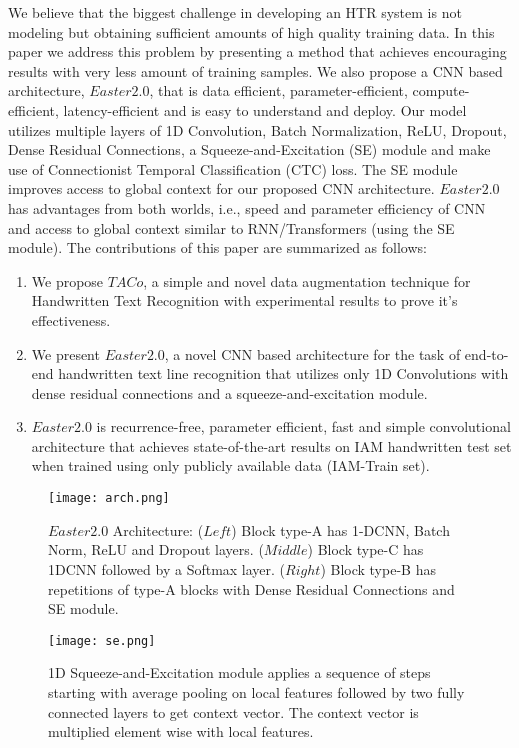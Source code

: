 \documentclass{article}
\begin{document}
We believe that the biggest challenge in developing an HTR system is not modeling but obtaining sufficient amounts of high quality training data. In this paper we address this problem by presenting a method that achieves encouraging results with very less amount of training samples. We also propose a CNN based architecture, $Easter2.0$,  that is data efficient, parameter-efficient, compute-efficient, latency-efficient and is easy to understand and deploy. Our model utilizes multiple layers of 1D Convolution, Batch Normalization, ReLU, Dropout, Dense Residual Connections, a Squeeze-and-Excitation (SE)\cite{hu2018squeeze} module and make use of  Connectionist Temporal Classification (CTC) loss\cite{graves2006connectionist}. The SE module improves access to global context for our proposed CNN architecture. $Easter2.0$ has advantages from both worlds, i.e., speed and parameter efficiency of CNN and access to global context similar to RNN/Transformers (using the SE module).  
The contributions of this paper are summarized as follows:
\begin{enumerate}
\item We propose $TACo$, a simple and novel data augmentation technique for Handwritten Text Recognition with experimental results to prove it's effectiveness.
\item We present $Easter2.0$, a novel CNN based architecture for the task of end-to-end handwritten text line recognition that utilizes only 1D Convolutions with dense residual connections and a squeeze-and-excitation module.
\item $Easter2.0$ is recurrence-free, parameter efficient, fast and simple convolutional architecture that achieves state-of-the-art results on IAM handwritten test set when trained using only publicly available data (IAM-Train set).
\end{enumerate}

\begin{figure}
  \centering
  \texttt{[image: arch.png]}
  \caption{$Easter2.0$ Architecture: ($Left$) Block type-A has 1-DCNN, Batch Norm, ReLU and Dropout layers. ($Middle$) Block type-C has 1DCNN followed by a Softmax layer. ($Right$) Block type-B has repetitions of type-A blocks with Dense Residual Connections and SE module.}
  \label{fig:arch}
\end{figure}


\begin{figure}
  \centering
  \texttt{[image: se.png]}
  \caption{1D Squeeze-and-Excitation module applies a sequence of steps starting with average pooling on local features followed by two fully connected layers to get context vector. The context vector is multiplied element wise with local features.}
\label{fig:se}
\end{figure}
\end{document}
